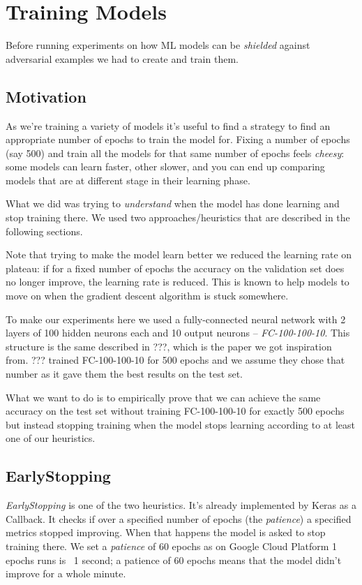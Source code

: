 \chapter{Training Models}

Before running experiments on how ML models can be \emph{shielded}
against adversarial examples we had to create and train them.

\section{Motivation}
\label{sec:motivation}
As we're training a variety of models it's useful to find a strategy to
find an appropriate number of epochs to train the model for. Fixing a
number of epochs (say 500) and train all the models for that same
number of epochs feels \emph{cheesy}: some models can learn faster,
other slower, and you can end up comparing models that are at different
stage in their learning phase.

What we did was trying to \emph{understand} when the model has done
learning and stop training there. We used two approaches/heuristics
that are described in the following sections.

Note that trying to make the model learn better we reduced the learning
rate on plateau: if for a fixed number of epochs the accuracy on the
validation set does no longer improve, the learning rate is reduced.
This is known to help models to move on when the gradient descent
algorithm is stuck somewhere.

To make our experiments here we used a fully-connected neural network
with 2 layers of 100 hidden neurons each and 10 output neurons --
\emph{FC-100-100-10}. This structure is the same described in ???,
which is the paper we got inspiration from. ??? trained FC-100-100-10
for 500 epochs and we assume they chose that number as it gave them the
best results on the test set.

What we want to do is to empirically prove that we can achieve the
same accuracy on the test set without training FC-100-100-10 for
exactly 500 epochs but instead stopping training when the model stops
learning according to at least one of our heuristics.

\section{EarlyStopping}
\emph{EarlyStopping} is one of the two heuristics. It's already
implemented by Keras as a Callback. It checks if over a specified
number of epochs (the \emph{patience}) a specified metrics stopped
improving. When that happens the model is asked to stop training there.
We set a \emph{patience} of 60 epochs as on Google Cloud Platform 1
epochs runs is ~1 second; a patience of 60 epochs means that the model
didn't improve for a whole minute.

